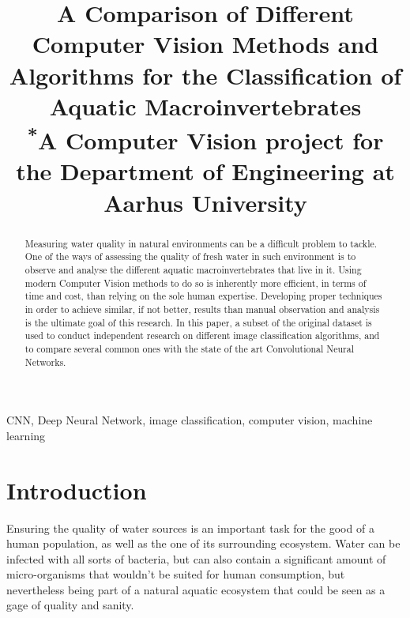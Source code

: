 \documentclass[conference]{IEEEtran}
\begin{document}
\title{A Comparison of Different Computer Vision Methods and Algorithms for the
    Classification of Aquatic Macroinvertebrates\\
{\footnotesize \textsuperscript{*}A Computer Vision project for the Department
of Engineering at Aarhus University}
}

\author{
}

\maketitle

\begin{abstract}
    Measuring water quality in natural environments can be a difficult problem to tackle. One of the ways of assessing the quality of fresh water in such environment is to observe and analyse the different aquatic macroinvertebrates that live in it. Using modern Computer Vision methods to do so is inherently more efficient, in terms of time and cost, than relying on the sole human expertise. Developing proper techniques in order to achieve similar, if not better, results than manual observation and analysis is the ultimate goal of this research. In this paper, a subset of the original dataset is used to conduct independent research on different image classification algorithms, and to compare several common ones with the state of the art Convolutional Neural Networks.
\end{abstract}

\begin{IEEEkeywords}
    CNN, Deep Neural Network, image classification, computer vision, machine learning
\end{IEEEkeywords}

\section{Introduction}
Ensuring the quality of water sources is an important task for the good of a human population, as well as the one of its surrounding ecosystem. Water can be infected with all sorts of bacteria, but can also contain a significant amount of micro-organisms that wouldn't be suited for human consumption, but nevertheless being part of a natural aquatic ecosystem that could be seen as a gage of quality and sanity.
\end{document}
